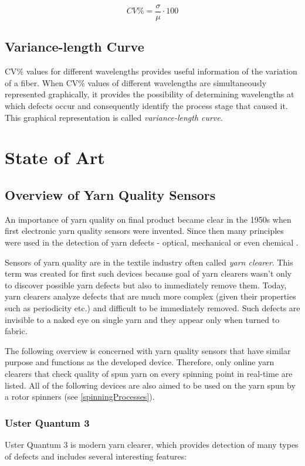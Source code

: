 \documentclass[twoside]{ctuthesis}
\theoremstyle{plain}
\theoremstyle{definition}
\theoremstyle{note}
\begin{document}
\begin{equation} \label{eq:CVCalculationIntroduction}
 CV\% = \frac{\sigma}{\mu} \cdot 100
\end{equation}

\subsection{Variance-length Curve}
\label{sec:VarianceL_curve}
CV\% values for different wavelengths provides useful information of the variation of a fiber. When CV\% values of different wavelengths are simultaneously represented graphically, it provides the possibility of determining wavelengths at which defects occur and consequently identify the process stage that caused it. This graphical representation is called \textit{variance-length curve}.

\section{State of Art}
\subsection{Overview of Yarn Quality Sensors}
An importance of yarn quality on final product became clear in the 1950s when first electronic yarn quality sensors were invented. Since then many principles were used in the detection of yarn defects - optical, mechanical or even chemical \cite{cite:1}.

Sensors of yarn quality are in the textile industry often called \textit{yarn clearer}. This term was created for first such devices because goal of yarn clearers wasn't only to discover possible yarn defects but also to immediately remove them. Today, yarn clearers analyze defects that are much more complex (given their properties such as periodicity etc.) and difficult to be immediately removed. Such defects are invisible to a naked eye on single yarn and they appear only when turned to fabric.

The following overview is concerned with yarn quality sensors that have similar purpose and functions as the developed device. Therefore, only online yarn clearers that check quality of spun yarn on every spinning point in real-time are listed. All of the following devices are also aimed to be used on the yarn spun by a rotor spinners (see \ref{spinningProcesses}).

\subsubsection{Uster Quantum 3}
Uster Quantum 3 is modern yarn clearer, which provides detection of many types of defects and includes several interesting features:
\end{document}

